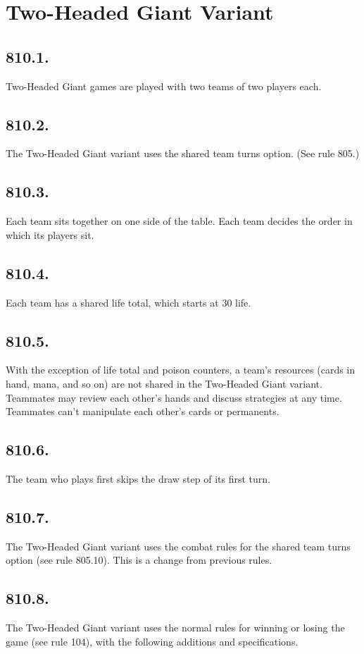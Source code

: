 \section{Two-Headed Giant Variant}
\subsection*{810.1.}
Two-Headed Giant games are played with two teams of two players each.

\subsection*{810.2.}
The Two-Headed Giant variant uses the shared team turns option. (See rule 805.)

\subsection*{810.3.}
Each team sits together on one side of the table. Each team decides the order in which its players sit.

\subsection*{810.4.}
Each team has a shared life total, which starts at 30 life.

\subsection*{810.5.}
With the exception of life total and poison counters, a team’s resources (cards in hand, mana, and so on) are not shared in the Two-Headed Giant variant. Teammates may review each other’s hands and discuss strategies at any time. Teammates can’t manipulate each other’s cards or permanents.

\subsection*{810.6.}
The team who plays first skips the draw step of its first turn.

\subsection*{810.7.}
The Two-Headed Giant variant uses the combat rules for the shared team turns option (see rule 805.10). This is a change from previous rules.

\subsection*{810.8.}
The Two-Headed Giant variant uses the normal rules for winning or losing the game (see rule 104), with the following additions and specifications.

